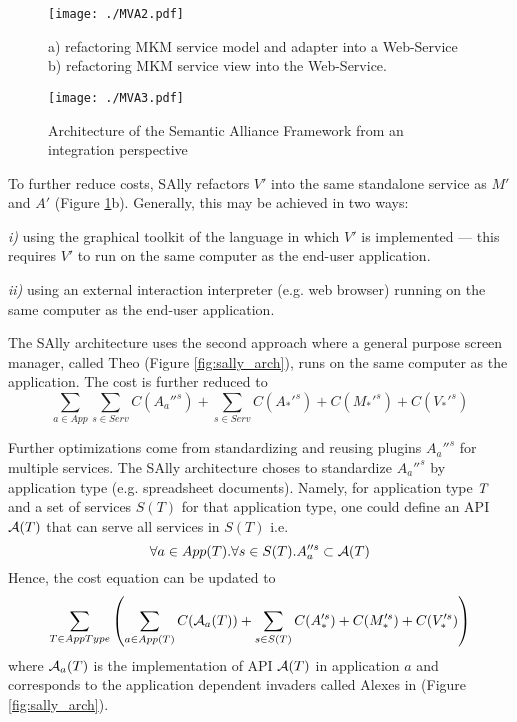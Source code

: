 \documentclass{llncs}
\begin{document}
\begin{figure}
\centering
\texttt{[image: ./MVA2.pdf]}
\caption{a) refactoring MKM service model and adapter into a Web-Service b) refactoring MKM service view into the Web-Service. }
\label{fig:integration_ws}
\end{figure}

\begin{figure}
\centering
\texttt{[image: ./MVA3.pdf]}
\caption{Architecture of the Semantic Alliance Framework from an integration perspective}
\label{fig:integration_strategies}
\end{figure}

To further reduce costs, SAlly refactors $V'$ into the same standalone service as $M'$ and $A'$ (Figure \ref{fig:integration_ws}b). Generally, this may be achieved in two ways: \begin{inparaenum}
\item [\textit{i)}] using the graphical toolkit of the language in which $V'$ is implemented --- this requires $V'$ to run on the same computer as the end-user application. 
\item [\textit{ii)}] using an external interaction interpreter (e.g. web browser) running on the same computer as the end-user application.
\end{inparaenum}
The SAlly architecture uses the second approach where a general purpose screen manager, called Theo (Figure \ref{fig:sally_arch}), runs on the same computer as the application. The cost is further reduced to
\begin{equation}
\sum_{a\in App} \sum_{s \in Serv} C(A_a''^s) + \sum_{s \in Serv} C(A_{*}'^s) + C(M_{*}'^s)+C(V_{*}'^s)
\label{eq:theo_integration_cost}
\end{equation}

Further optimizations come from standardizing and reusing plugins $A_a''^s$ for multiple services. The SAlly architecture choses to standardize $A_a''^s$ by application type (e.g. spreadsheet documents). Namely, for application type \textit{T} and a set of services $S(T)$ for that application type, one could define an API $\mathcal{A}(T)$ that can serve all services in $S(T)$ i.e. 
\begin{equation}
\forall a\in App(T). \forall s\in S(T). A_a''^s \subset \mathcal{A}(T)
\label{eq:APIT}
\end{equation}
Hence, the cost equation can be updated to
\begin{equation}
\sum_{T\in AppType}\left( \sum_{a \in App(T)} C(\mathcal{A}_a(T)) + \sum_{s \in S(T)} C(A_{*}'^s) + C(M_{*}'^s)+C(V_{*}'^s)\right)
\label{eq:alex_refactor}
\end{equation}
where $\mathcal{A}_a(T)$ is the implementation of API $\mathcal{A}(T)$ in application $a$ and corresponds to the application dependent invaders called Alexes in \cite{DavJucKoh:safusa12} (Figure \ref{fig:sally_arch}). 
\end{document}
